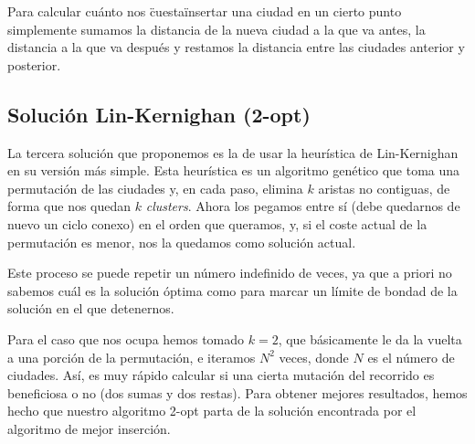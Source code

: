 \documentclass[a4paper, 11pt]{article}
\begin{document}
Para calcular cuánto nos \"cuesta\" insertar una ciudad en un cierto punto simplemente sumamos la distancia de la nueva ciudad a la que va antes, la distancia a la que va después y restamos la distancia entre las ciudades anterior y posterior.

\subsection{Solución Lin-Kernighan (2-opt)}
La tercera solución que proponemos es la de usar la heurística de Lin-Kernighan en su versión más simple. Esta heurística es un algoritmo genético que toma una permutación de las ciudades y, en cada paso, elimina $k$ aristas no contiguas, de forma que nos quedan $k$ \textit{clusters}. Ahora los pegamos entre sí (debe quedarnos de nuevo un ciclo conexo) en el orden que queramos, y, si el coste actual de la permutación es menor, nos la quedamos como solución actual.

Este proceso se puede repetir un número indefinido de veces, ya que a priori no sabemos cuál es la solución óptima como para marcar un límite de bondad de la solución en el que detenernos.

Para el caso que nos ocupa hemos tomado $k=2$, que básicamente le da la vuelta a una porción de la permutación, e iteramos $N^2$ veces, donde $N$ es el número de ciudades. Así, es muy rápido calcular si una cierta mutación del recorrido es beneficiosa o no (dos sumas y dos restas). Para obtener mejores resultados, hemos hecho que nuestro algoritmo 2-opt parta de la solución encontrada por el algoritmo de mejor inserción.
\end{document}
